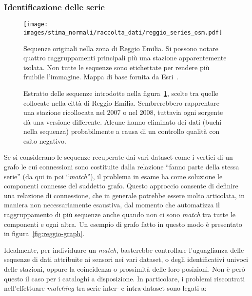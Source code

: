 \subsubsection{Identificazione delle serie}
\begin{figure}[ht]
  \centering
  \texttt{[image: images/stima\_normali/raccolta\_dati/reggio\_series\_osm.pdf]}
  \caption{Sequenze originali nella zona di Reggio Emilia. Si possono notare quattro raggruppamenti principali più una stazione apparentemente isolata. Non tutte le sequenze sono etichettate per rendere più fruibile l'immagine. Mappa di base fornita da Esri~\autocite{esriWorldTopographicMap2013}.}\label{fig:reggio-osm}
\end{figure}
\begin{figure}[ht]
  \centering
  
  \caption{Estratto delle sequenze introdotte nella figura~\ref{fig:reggio-osm}, scelte tra quelle collocate nella città di Reggio Emilia. Sembrerebbero rapprentare una stazione ricollocata nel 2007 o nel 2008, tuttavia ogni sorgente dà una versione differente. Alcune hanno eliminato dei dati (buchi nella sequenza) probabilmente a causa di un controllo qualità con esito negativo.}\label{fig:reggio-plot}
\end{figure}
Se si considerano le sequenze recuperate dai vari dataset come i vertici di un grafo le cui connessioni sono costituite dalla relazione ``fanno parte della stessa serie'' (da qui in poi ``\emph{match}''), il problema in esame ha come soluzione le componenti connesse del suddetto grafo. Questo approccio consente di definire una relazione di connessione, che in generale potrebbe essere molto articolata, in maniera non necessariamente esaustiva, dal momento che automatizza il raggruppamento di più sequenze anche quando non ci sono \emph{match} tra tutte le componenti e ogni altra. Un esempio di grafo fatto in questo modo è presentato in figura~\ref{fig:reggio-graph}.

Idealmente, per individuare un \emph{match}, basterebbe controllare l'uguaglianza delle sequenze di dati attribuite ai sensori nei vari dataset, o degli identificativi univoci delle stazioni, oppure la coincidenza o prossimità delle loro posizioni. Non è però questo il caso per i cataloghi a disposizione. In particolare, i problemi riscontrati nell'effettuare \emph{matching} tra serie inter- e intra-dataset sono legati a:

